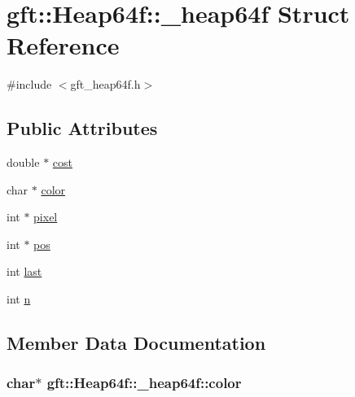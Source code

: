\hypertarget{structgft_1_1Heap64f_1_1__heap64f}{}\section{gft\+:\+:Heap64f\+:\+:\+\_\+heap64f Struct Reference}
\label{structgft_1_1Heap64f_1_1__heap64f}


{\ttfamily \#include $<$gft\+\_\+heap64f.\+h$>$}

\subsection*{Public Attributes}
\begin{DoxyCompactItemize}
\item 
double $\ast$ \hyperlink{structgft_1_1Heap64f_1_1__heap64f_a68ea05d73c380a8d388778d0aa4ce756}{cost}
\item 
char $\ast$ \hyperlink{structgft_1_1Heap64f_1_1__heap64f_a4b4b5909eabec5e3a96aee932bff7ade}{color}
\item 
int $\ast$ \hyperlink{structgft_1_1Heap64f_1_1__heap64f_aab4e3f723e085f0d5c736adaae30429f}{pixel}
\item 
int $\ast$ \hyperlink{structgft_1_1Heap64f_1_1__heap64f_ade3e491853f21a3f1275ea8588ffd4b1}{pos}
\item 
int \hyperlink{structgft_1_1Heap64f_1_1__heap64f_aa24cd2e1ae114ff4d798b7c3ca9eaabb}{last}
\item 
int \hyperlink{structgft_1_1Heap64f_1_1__heap64f_ab17122bfc57a325380ab6e1e81480bdc}{n}
\end{DoxyCompactItemize}


\subsection{Member Data Documentation}
\subsubsection[{\texorpdfstring{color}{color}}]{\setlength{\rightskip}{0pt plus 5cm}char$\ast$ gft\+::\+Heap64f\+::\+\_\+heap64f\+::color}\hypertarget{structgft_1_1Heap64f_1_1__heap64f_a4b4b5909eabec5e3a96aee932bff7ade}{}\label{structgft_1_1Heap64f_1_1__heap64f_a4b4b5909eabec5e3a96aee932bff7ade}
